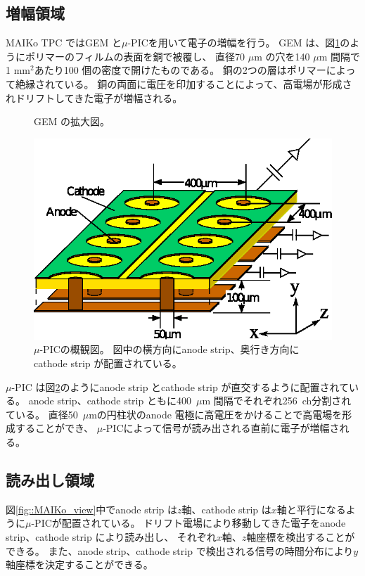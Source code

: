 \subsection{増幅領域}
MAIKo TPC ではGEM と$\mu$-PICを用いて電子の増幅を行う。
GEM は、図\ref{pic::GEM}のようにポリマーのフィルムの表面を銅で被覆し、
直径70 $\mu$m の穴を140 $\mu$m 間隔で1 mm$^2$あたり100 個の密度で開けたものである。
銅の2つの層はポリマーによって絶縁されている。
銅の両面に電圧を印加することによって、高電場が形成されドリフトしてきた電子が増幅される。
\begin{figure}
  \centering
  \caption{GEM の拡大図。}
  \label{pic::GEM}  
\end{figure}
\begin{figure}
  \centering
  \includegraphics[clip, width=0.7\columnwidth]{eps/upic_struc_xyz.eps}
  \caption[$\mu$-PICの概観図。]{$\mu$-PICの概観図。
    図中の横方向にanode strip、奥行き方向にcathode strip が配置されている。
  }
  \label{fig::mupic}
\end{figure}
$\mu$-PIC は図\ref{fig::mupic}のようにanode strip とcathode strip が直交するように配置されている。
anode strip、cathode strip ともに400~$\mu$m 間隔でそれぞれ256~ch分割されている。
直径50~$\mu$mの円柱状のanode 電極に高電圧をかけることで高電場を形成することができ、
$\mu$-PICによって信号が読み出される直前に電子が増幅される。

\subsection{読み出し領域}
\label{sec::mu-pic}
図\ref{fig::MAIKo_view}中でanode strip は$z$軸、cathode strip は$x$軸と平行になるように$\mu$-PICが配置されている。
ドリフト電場により移動してきた電子をanode strip、cathode strip により読み出し、
それぞれ$x$軸、$z$軸座標を検出することができる。
また、anode strip、cathode strip で検出される信号の時間分布により$y$軸座標を決定することができる。

